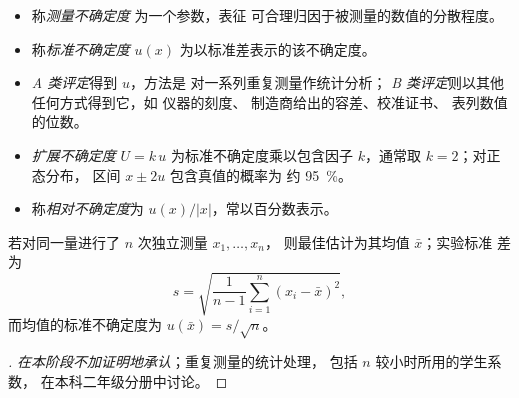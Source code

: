 \begin{definition}[测量不确定度]\label{def:b1:lab-techniques-1:uncertainty}
\begin{itemize}
  \item 称\emph{测量不确定度}
        为一个参数，表征
        可合理归因于被测量的数值的分散程度。
  \item 称\emph{标准不确定度} $u(x)$
        为以标准差表示的该不确定度。
  \item \emph{A 类评定}得到 $u$，方法是
        对一系列重复测量作统计分析；
        \emph{B 类评定}则以其他任何方式得到它，如
        仪器的刻度、
        制造商给出的容差、校准证书、
        表列数值的位数。
  \item \emph{扩展不确定度}
        $U = k\,u$ 为标准不确定度乘以包含因子
        $k$，通常取 $k = 2$；对正态分布，
        区间 $x \pm 2u$ 包含真值的概率为
        约 \qty{95}{\percent}。
  \item 称\emph{相对不确定度}为
        $u(x)/|x|$，常以百分数表示。
\end{itemize}
\end{definition}

\begin{proposition}[A 类评定]\label{prop:b1:lab-techniques-1:type-a}
若对同一量进行了 $n$ 次独立测量 $x_1, \dots, x_n$，
则最佳估计为其均值 $\bar x$；实验标准
差为
\[
  s = \sqrt{\frac{1}{n-1} \sum_{i=1}^{n} (x_i - \bar x)^2},
\]
而均值的标准不确定度为 $u(\bar x) = s/\sqrt{n}$。
\end{proposition}
\begin{proof}[\omnameProof]
\emph{在本阶段不加证明地承认}；重复测量的统计处理，
包括 $n$ 较小时所用的学生系数，
在本科二年级分册中讨论。
\end{proof}

